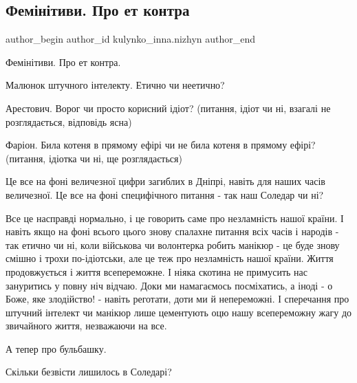  
 
 
 
 

\subsection{Фемінітиви. Про ет контра}
\label{sec:17_01_2023.fb.kulynko_inna.nizhyn.1.fem_n_tivi__pro_yet_}

\ifcmt
 author_begin
   author_id kulynko_inna.nizhyn
 author_end
\fi

Фемінітиви. Про ет контра.

Малюнок штучного інтелекту. Етично чи неетично?

Арестович. Ворог чи просто корисний ідіот? (питання, ідіот чи ні, взагалі не
розглядається, відповідь ясна)

Фаріон. Била котеня в прямому ефірі чи не била котеня в прямому ефірі?
(питання, ідіотка чи ні, ще розглядається)

Це все на фоні величезної цифри загиблих в Дніпрі, навіть для наших часів
величезної. Це все на фоні специфічного питання - так наш Соледар чи ні?

Все це насправді нормально, і це говорить саме про незламність нашої країни. І
навіть якщо на фоні всього цього знову спалахне питання всіх часів і народів -
так етично чи ні, коли військова чи волонтерка робить манікюр - це буде знову
смішно і трохи по-ідіотськи, але це теж про незламність нашої країни. Життя
продовжується і життя всепереможне. І ніяка скотина не примусить нас зануритись
у повну ніч відчаю. Доки ми намагаємось посміхатись, а іноді - о Боже, яке
злодійство! - навіть реготати, доти ми й непереможні. І сперечання про штучний
інтелект чи манікюр лише цементують оцю нашу всепереможну жагу до звичайного
життя, незважаючи на все.

А тепер про бульбашку.

Скільки безвісти лишилось в Соледарі?

